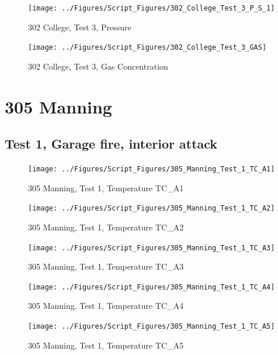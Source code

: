 \documentclass[12pt,oneside]{book}
\begin{document}
\begin{figure}[!ht]
\texttt{[image: ../Figures/Script\_Figures/302\_College\_Test\_3\_P\_S\_1]}
\caption{302 College, Test 3, Pressure}
\label{fig:302_College_Test_3_P_S_1}
\end{figure}

\begin{figure}[!ht]
\texttt{[image: ../Figures/Script\_Figures/302\_College\_Test\_3\_GAS]}
\caption{302 College, Test 3, Gas Concentration}
\label{fig:302_College_Test_3_GAS}
\end{figure}


\clearpage


\section{305 Manning}

\subsection{Test 1, Garage fire, interior attack}

\begin{figure}[!ht]
\texttt{[image: ../Figures/Script\_Figures/305\_Manning\_Test\_1\_TC\_A1]}
\caption{305 Manning, Test 1, Temperature TC\_A1}
\label{fig:305_Manning_Test_1_TC_A1}
\end{figure}

\begin{figure}[!ht]
\texttt{[image: ../Figures/Script\_Figures/305\_Manning\_Test\_1\_TC\_A2]}
\caption{305 Manning, Test 1, Temperature TC\_A2}
\label{fig:305_Manning_Test_1_TC_A2}
\end{figure}

\begin{figure}[!ht]
\texttt{[image: ../Figures/Script\_Figures/305\_Manning\_Test\_1\_TC\_A3]}
\caption{305 Manning, Test 1, Temperature TC\_A3}
\label{fig:305_Manning_Test_1_TC_A3}
\end{figure}

\begin{figure}[!ht]
\texttt{[image: ../Figures/Script\_Figures/305\_Manning\_Test\_1\_TC\_A4]}
\caption{305 Manning, Test 1, Temperature TC\_A4}
\label{fig:305_Manning_Test_1_TC_A4}
\end{figure}

\begin{figure}[!ht]
\texttt{[image: ../Figures/Script\_Figures/305\_Manning\_Test\_1\_TC\_A5]}
\caption{305 Manning, Test 1, Temperature TC\_A5}
\label{fig:305_Manning_Test_1_TC_A5}
\end{figure}
\end{document}
